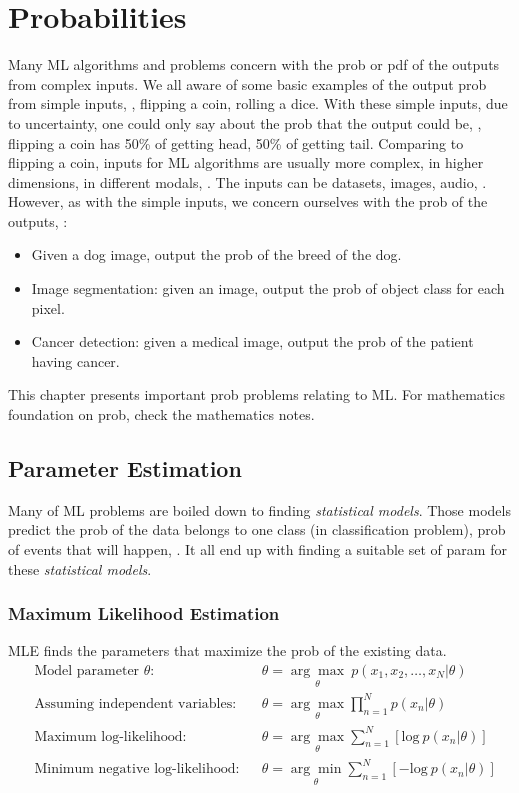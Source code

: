 \chapter{Probabilities}
\label{cha:probabilities}

Many \ac{ML} algorithms and problems concern with the \ac{prob} or \ac{pdf} of the outputs from complex inputs. We all aware of some basic examples of the output \ac{prob} from simple inputs, \eg, flipping a coin, rolling a dice. With these simple inputs, due to uncertainty, one could only say about the \ac{prob} that the output could be, \eg, flipping a coin has 50\% of getting head, 50\% of getting tail. Comparing to flipping a coin, inputs for \ac{ML} algorithms are usually more complex, in higher dimensions, in different modals, \etc. The inputs can be datasets, images, audio, \etc. However, as with the simple inputs, we concern ourselves with the \ac{prob} of the outputs, \eg:
\begin{itemize}
	\item Given a dog image, output the \ac{prob} of the breed of the dog.
	\item Image segmentation: given an image, output the \ac{prob} of object class for each pixel.
	\item Cancer detection: given a medical image, output the \ac{prob} of the patient having cancer.
\end{itemize}
This chapter presents important \ac{prob} problems relating to \ac{ML}. For mathematics foundation on \ac{prob}, check the mathematics notes.


\section{Parameter Estimation}
Many of \ac{ML} problems are boiled down to finding \textit{statistical models}. Those models predict the \ac{prob} of the data belongs to one class (in classification problem), \ac{prob} of events that will happen, \etc. It all end up with finding a suitable set of \ac{param} for these \textit{statistical models}.

\subsection{Maximum Likelihood Estimation}
\label{subsec:mle}
\ac{MLE} finds the parameters that maximize the \ac{prob} of the existing data.
\begin{align}
	&\text{Model parameter $\theta$:} &&\theta = \underset{\theta}{\arg\max}\:p(x_1, x_2, \dots, x_N | \theta) \\
	&\text{Assuming independent variables:} &&\theta = \underset{\theta}{\arg\max} \prod^N_{n=1} p(x_n | \theta) \\
	&\text{Maximum log-likelihood:} &&\theta = \underset{\theta}{\arg\max} \sum^N_{n=1} \left[\text{log}\:p(x_n | \theta) \right]\\
	&\text{Minimum negative log-likelihood:} && \theta = \underset{\theta}{\arg\min} \sum^N_{n=1} \left[-\text{log}\:p(x_n | \theta)\right]
\end{align}

